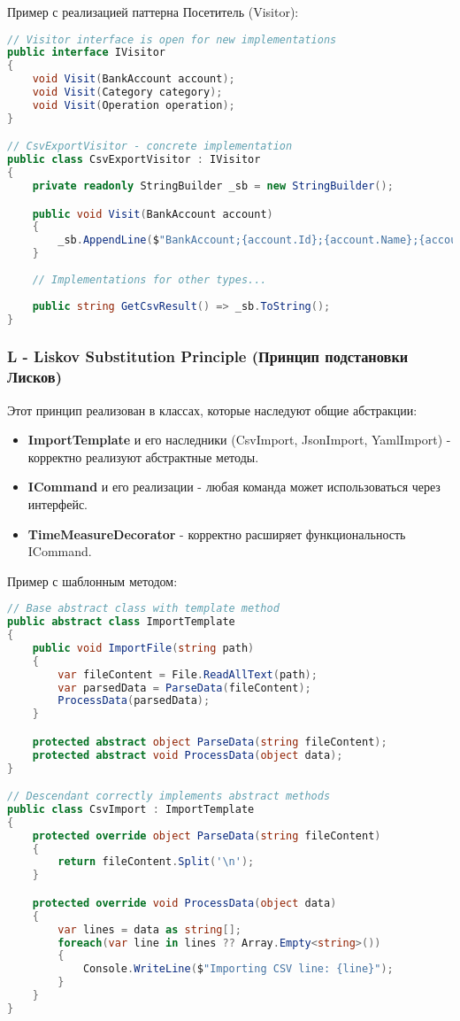 \documentclass[12pt,a4paper]{article}
\begin{document}
Пример с реализацией паттерна Посетитель (Visitor):

\begin{lstlisting}[language=csharp]
// Visitor interface is open for new implementations
public interface IVisitor
{
    void Visit(BankAccount account);
    void Visit(Category category);
    void Visit(Operation operation);
}

// CsvExportVisitor - concrete implementation
public class CsvExportVisitor : IVisitor
{
    private readonly StringBuilder _sb = new StringBuilder();

    public void Visit(BankAccount account)
    {
        _sb.AppendLine($"BankAccount;{account.Id};{account.Name};{account.Balance}");
    }
    
    // Implementations for other types...
    
    public string GetCsvResult() => _sb.ToString();
}
\end{lstlisting}

\subsubsection{L - Liskov Substitution Principle (Принцип подстановки Лисков)}

Этот принцип реализован в классах, которые наследуют общие абстракции:

\begin{itemize}
    \item \textbf{ImportTemplate} и его наследники (CsvImport, JsonImport, YamlImport) - корректно реализуют абстрактные методы.
    \item \textbf{ICommand} и его реализации - любая команда может использоваться через интерфейс.
    \item \textbf{TimeMeasureDecorator} - корректно расширяет функциональность ICommand.
\end{itemize}

Пример с шаблонным методом:

\begin{lstlisting}[language=csharp]
// Base abstract class with template method
public abstract class ImportTemplate
{
    public void ImportFile(string path)
    {
        var fileContent = File.ReadAllText(path);
        var parsedData = ParseData(fileContent);
        ProcessData(parsedData);
    }

    protected abstract object ParseData(string fileContent);
    protected abstract void ProcessData(object data);
}

// Descendant correctly implements abstract methods
public class CsvImport : ImportTemplate
{
    protected override object ParseData(string fileContent)
    {
        return fileContent.Split('\n');
    }

    protected override void ProcessData(object data)
    {
        var lines = data as string[];
        foreach(var line in lines ?? Array.Empty<string>())
        {
            Console.WriteLine($"Importing CSV line: {line}");
        }
    }
}
\end{lstlisting}
\end{document}
